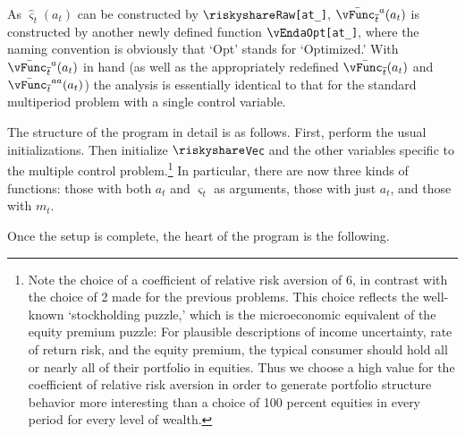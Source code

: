 \documentclass[titlepage, headings=optiontotocandhead]{\econtex}
\begin{document}
As $\hat{\varsigma}_{t}({a}_{t})$ can be constructed by
\texttt{$\riskyshare$Raw[at\_]}, $\bar{\vEOPt}^{a}({a}_{t})$ is
constructed by another newly defined function
\texttt{$\vEnd$aOpt[at\_]}, where the naming convention is obviously
that `Opt' stands for `Optimized.' With
$\bar{\vEOPt}^{{a}}({a}_{t})$ in
hand (as well as the appropriately redefined
$\bar{\vEOPt}({a}_{t})$ and $\bar{\vEOPt}^{{aa}}({a}_{t})$) the analysis is essentially identical to that for the standard
multiperiod problem with a single control variable.

The structure of the program in detail is as follows.  First,
perform  the usual
initializations. Then initialize \texttt{$\riskyshare$Vec} and the other
variables specific to the multiple control problem.\footnote{Note
  the choice of a coefficient of relative risk aversion of 6, in
  contrast with the choice of 2 made for the previous problems.  This
  choice reflects the well-known `stockholding puzzle,' which is the
  microeconomic equivalent of the equity premium puzzle: For plausible
  descriptions of income uncertainty, rate of return risk, and the
  equity premium, the typical consumer should hold all or nearly all
  of their portfolio in equities. Thus we choose a high value for the
  coefficient of relative risk aversion in order to generate portfolio
  structure behavior more interesting than a choice of 100 percent
  equities in every period for every level of wealth.} In particular,
there are now three kinds of functions: those with both ${a}_{t}$
and $\varsigma_{t}$ as arguments, those with just ${a}_{t}$, and those
with ${m}_{t}$.

Once the setup is complete, the heart of the program is the
following.
\end{document}
